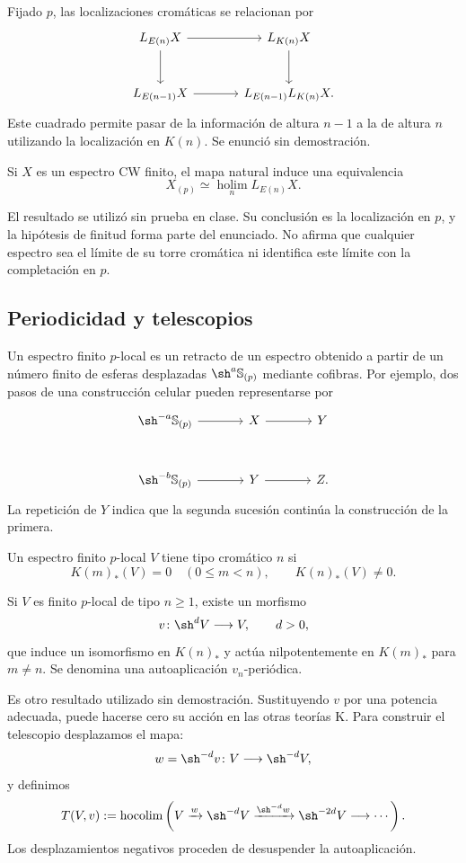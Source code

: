 Fijado $p$, las localizaciones cromáticas se relacionan por
\[
\begin{tikzcd}[column sep=large,row sep=large]
L_{E(n)}X\arrow[r]\arrow[d]&L_{K(n)}X\arrow[d]\\
L_{E(n-1)}X\arrow[r]&L_{E(n-1)}L_{K(n)}X.
\end{tikzcd}
\]
Este cuadrado permite pasar de la información de altura $n-1$ a la de altura $n$ utilizando la localización en $K(n)$. Se enunció sin demostración.

\begin{teo}\label{teo:c24-convergencia}
Si $X$ es un espectro CW finito, el mapa natural induce una equivalencia
\[
X_{(p)}\simeq\operatorname*{holim}_{n}L_{E(n)}X.
\]
\end{teo}
El resultado se utilizó sin prueba en clase. Su conclusión es la localización en $p$, y la hipótesis de finitud forma parte del enunciado. No afirma que cualquier espectro sea el límite de su torre cromática ni identifica este límite con la completación en $p$.

\subsection{Periodicidad y telescopios}
Un espectro finito $p$-local es un retracto de un espectro obtenido a partir de un número finito de esferas desplazadas $\sh^a\mathbb S_{(p)}$ mediante cofibras. Por ejemplo, dos pasos de una construcción celular pueden representarse por
\[
\begin{tikzcd}[column sep=large,row sep=large]
\sh^{-a}\mathbb S_{(p)}\arrow[r]&X\arrow[r]&Y\\
\sh^{-b}\mathbb S_{(p)}\arrow[r]&Y\arrow[r]&Z.
\end{tikzcd}
\]
La repetición de $Y$ indica que la segunda sucesión continúa la construcción de la primera.

\begin{defi}
Un espectro finito $p$-local $V$ tiene tipo cromático $n$ si
\[
K(m)_*(V)=0\quad(0\leq m<n),
\qquad K(n)_*(V)\ne0.
\]
\end{defi}

\begin{teo}\label{teo:c24-periodicidad}
Si $V$ es finito $p$-local de tipo $n\geq1$, existe un morfismo
\[
v\colon\sh^dV\longrightarrow V,\qquad d>0,
\]
que induce un isomorfismo en $K(n)_*$ y actúa nilpotentemente en $K(m)_*$ para $m\ne n$. Se denomina una autoaplicación $v_n$-periódica.
\end{teo}
Es otro resultado utilizado sin demostración. Sustituyendo $v$ por una potencia adecuada, puede hacerse cero su acción en las otras teorías K. Para construir el telescopio desplazamos el mapa:
\[
w=\sh^{-d}v\colon V\longrightarrow\sh^{-d}V,
\]
y definimos
\[
T(V,v):=\operatorname*{hocolim}\left(
V\xrightarrow{w}\sh^{-d}V
\xrightarrow{\sh^{-d}w}\sh^{-2d}V\longrightarrow\cdots\right).
\]
Los desplazamientos negativos proceden de desuspender la autoaplicación.

